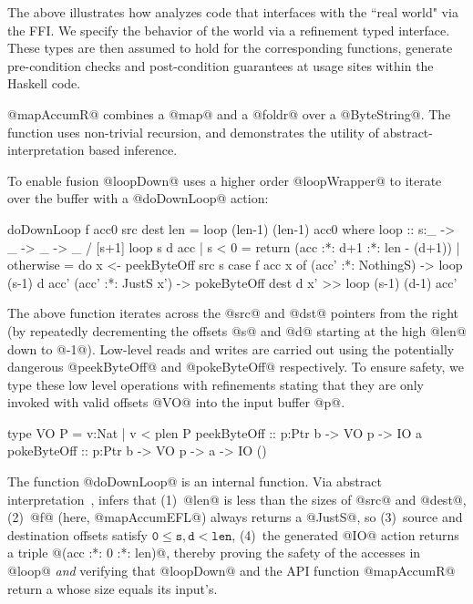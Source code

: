 The above illustrates how \toolname analyzes code that interfaces 
with the ``real world" via the \C FFI. We specify the behavior 
of the world via a refinement typed interface. These types are then assumed
to hold for the corresponding functions, \ie generate pre-condition checks
and post-condition guarantees at usage sites within the Haskell code.


@mapAccumR@ combines a @map@ and a @foldr@ over a @ByteString@. 
The function uses non-trivial recursion, and demonstrates 
the utility of abstract-interpretation based inference. 
%
To enable fusion \cite{streamfusion} 
@loopDown@ uses a higher order @loopWrapper@ 
to iterate over the buffer with a @doDownLoop@ action:
%
\begin{code}
  doDownLoop f acc0 src dest len = loop (len-1) (len-1) acc0
    where
     loop :: s:_ -> _ -> _ -> _ / [s+1]
     loop s d acc 
       | s < 0 
       = return (acc :*: d+1 :*: len - (d+1))
       | otherwise       
       = do x <- peekByteOff src s
            case f acc x of
              (acc' :*: NothingS) -> 
                   loop (s-1) d acc'
              (acc' :*: JustS x') -> 
                   pokeByteOff dest d x'
                >> loop (s-1) (d-1) acc'
\end{code}

The above function iterates across the @src@ and @dst@ 
pointers from the right (by repeatedly decrementing the 
offsets @s@ and @d@ starting at the high @len@ down to @-1@). 
Low-level reads and writes are carried out using the 
potentially dangerous @peekByteOff@ and @pokeByteOff@ 
respectively. To ensure safety, we type these low level 
operations with refinements stating that they are only 
invoked with valid offsets @VO@ into the input buffer @p@.

\begin{code}
  type VO P    = {v:Nat | v < plen P}
  peekByteOff :: p:Ptr b -> VO p -> IO a
  pokeByteOff :: p:Ptr b -> VO p -> a -> IO ()
\end{code}

The function @doDownLoop@ is an internal function.
Via abstract interpretation~\cite{LiquidPLDI08}, 
\toolname infers that
%
(1)~@len@ is less than the sizes of @src@ and @dest@,
(2)~@f@ (here, @mapAccumEFL@) always returns a @JustS@, so
(3)~source and destination offsets satisfy $$,
(4)~the generated @IO@ action returns a triple @(acc :*: 0 :*: len)@,
%
thereby proving the safety of the accesses in @loop@ \emph{and}
verifying that @loopDown@ and the API function @mapAccumR@ 
return a \bytestring whose size equals its input's.
 
